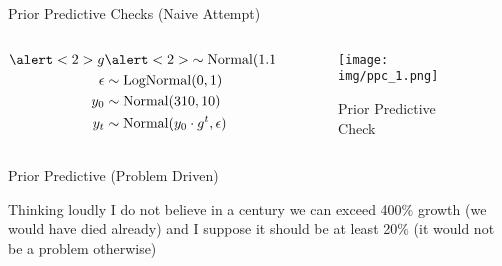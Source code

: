 \documentclass{beamer}
\begin{document}
\begin{frame}{Prior Predictive Checks (Naive Attempt)}
\begin{columns}
    \begin{column}{0.5\linewidth}
    \begin{align*}
        \alert<2>{g} &\alert<2>{\sim \operatorname{Normal}(1.1, 0.1)}\\
        \eps &\sim \operatorname{LogNormal}(0, 1)\\
        y_0 &\sim \operatorname{Normal}(310, 10)\\
        y_t &\sim \operatorname{Normal}(y_0 \cdot g^t, \eps)
    \end{align*}
    \end{column}
    \begin{column}{0.5\linewidth}
    \begin{figure}
        \centering
        \texttt{[image: img/ppc\_1.png]}
        \caption{Prior Predictive Check}
    \end{figure}
    \end{column}
\end{columns}
\end{frame}
\begin{frame}{Prior Predictive (Problem Driven)}
    \begin{block}{Thinking loudly}
    I do not believe in a century we can exceed 400\% growth (we would have died already) and I suppose it should be at least 20\% (it would not be a problem otherwise)
    \end{block}
\end{frame}
\end{document}
